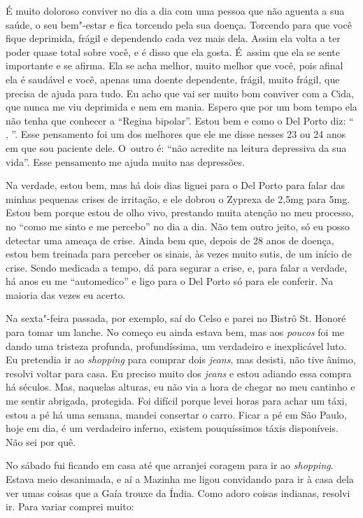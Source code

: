 É muito doloroso conviver no dia a dia com uma pessoa que não aguenta a
sua saúde, o seu bem"-estar e fica torcendo pela sua doença. Torcendo
para que você fique deprimida, frágil e dependendo cada vez mais dela.
Assim ela volta a ter poder quase total sobre você, e é disso que ela
gosta. É~assim que ela se sente importante e se afirma. Ela se acha
melhor, muito melhor que você, pois afinal ela é saudável e você, apenas
uma doente dependente, frágil, muito frágil, que precisa de ajuda para
tudo. Eu acho que vai ser muito bom conviver com a Cida, que nunca me
viu deprimida e nem em mania. Espero que por um bom tempo ela não tenha
que conhecer a ``Regina bipolar''. Estou bem e como o Del Porto diz:
``  ,  ''. 
Esse pensamento foi um dos melhores
que ele me disse nesses 23 ou 24 anos em que sou paciente dele. O~outro
é: ``não acredite na leitura depressiva da sua vida''. Esse pensamento
me ajuda muito nas depressões.

Na verdade, estou bem, mas há dois dias liguei para o Del Porto para
falar das minhas pequenas crises de irritação, e ele dobrou o Zyprexa de
2,5mg para 5mg. Estou bem porque estou de olho vivo, prestando muita
atenção no meu processo, no ``como me sinto e me percebo'' no dia a dia.
Não tem outro jeito, só eu posso detectar uma ameaça de crise. Ainda bem
que, depois de 28 anos de doença, estou bem treinada para perceber os
sinais, às vezes muito sutis, de um início de crise. Sendo medicada a
tempo, dá para segurar a crise, e, para falar a verdade, há anos eu me
``automedico'' e ligo para o Del Porto só para ele conferir. Na maioria
das vezes eu acerto.

Na sexta"-feira passada, por exemplo, saí do Celso e parei no Bistrô St.
Honoré para tomar um lanche. No começo eu ainda estava bem, mas aos
\emph{poucos} foi me dando uma tristeza profunda, profundíssima, um
verdadeiro e inexplicável luto. Eu pretendia ir ao \emph{shopping} para
comprar dois \emph{jeans}, mas desisti, não tive ânimo, resolvi voltar
para casa. Eu preciso muito dos \emph{jeans} e estou adiando essa compra
há séculos. Mas, naquelas alturas, eu não via a hora de chegar no meu
cantinho e me sentir abrigada, protegida. Foi difícil porque levei horas
para achar um táxi, estou a pé há uma semana, mandei consertar o carro.
Ficar a pé em São Paulo, hoje em dia, é um verdadeiro inferno, existem
pouquíssimos táxis disponíveis. Não sei por quê.

No sábado fui ficando em casa até que arranjei coragem para ir ao
\emph{shopping}. Estava meio desanimada, e aí a Mazinha me ligou
convidando para ir à casa dela ver umas coisas que a Gaía trouxe da
Índia. Como adoro coisas indianas, resolvi ir. Para variar comprei
muito:

